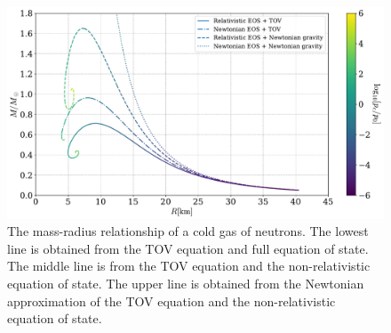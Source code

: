 \begin{figure}[h]
    \centering
    \includegraphics[width=\textwidth]{../scripts/figurer/mass_radius_comparison.pdf}
    \caption{The mass-radius relationship of a cold gas of neutrons. The lowest line is obtained from the TOV equation and full equation of state. The middle line is from the TOV equation and the non-relativistic equation of state. The upper line is obtained from the Newtonian approximation of the TOV equation and the non-relativistic equation of state.}
    \label{fig: mass radius relationship comparison}
\end{figure}

